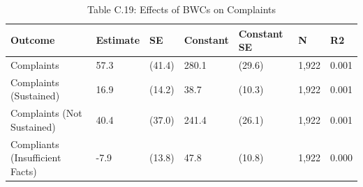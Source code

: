 \begin{table}

\caption{Table C.19: Effects of BWCs on Complaints}
\centering
\begin{tabular}[t]{lllllll}
\toprule
Outcome & Estimate & SE & Constant & Constant SE & N & R2\\
\midrule
Complaints & 57.3 & (41.4) & 280.1 & (29.6) & 1,922 & 0.001\\
Complaints (Sustained) & 16.9 & (14.2) & 38.7 & (10.3) & 1,922 & 0.001\\
Complaints (Not Sustained) & 40.4 & (37.0) & 241.4 & (26.1) & 1,922 & 0.001\\
Compliants (Insufficient Facts) & -7.9 & (13.8) & 47.8 & (10.8) & 1,922 & 0.000\\
\bottomrule
\end{tabular}
\end{table}
